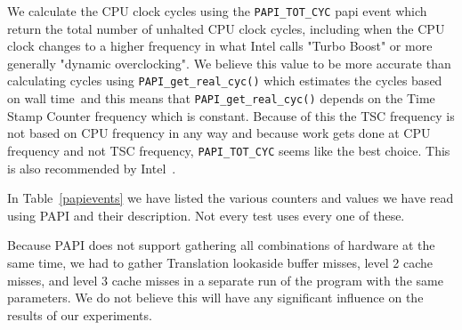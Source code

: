 We calculate the CPU clock cycles using the \texttt{PAPI\_TOT\_CYC} papi event which return the total number of unhalted CPU clock cycles, including when the CPU clock changes to a higher frequency in what Intel calls "Turbo Boost" or more generally "dynamic overclocking".
We believe this value to be more accurate than calculating cycles using \texttt{PAPI\_get\_real\_cyc()} which estimates the cycles based on wall time~and this means that \texttt{PAPI\_get\_real\_cyc()} depends on the Time Stamp Counter frequency which is constant. 
Because of this the TSC frequency is not based on CPU frequency in any way and because work gets done at CPU frequency and not TSC frequency, \texttt{PAPI\_TOT\_CYC} seems like the best choice. 
This is also recommended by Intel~.

In Table~\ref{papievents} we have listed the various counters and values we have read using PAPI and their description. Not every test uses every one of these.

Because PAPI does not support gathering all combinations of hardware at the same time, we had to gather Translation lookaside buffer misses, level 2 cache misses, and level 3 cache misses in a separate run of the program with the same parameters.
We do not believe this will have any significant influence on the results of our experiments.


